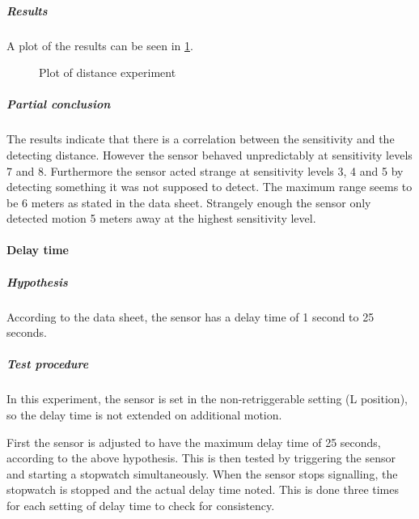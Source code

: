 \subparagraph{Results}

A plot of the results can be seen in \cref{fig:pir_distance}.

\begin{figure}[htbp]
\centering
{}
\caption[Distance experiment]{Plot of distance experiment}\label{fig:pir_distance}
\end{figure}

\subparagraph{Partial conclusion}
The results indicate that there is a correlation between the sensitivity and the detecting distance.
However the sensor behaved unpredictably at sensitivity levels 7 and 8.
Furthermore the sensor acted strange at sensitivity levels 3, 4 and 5 by detecting something it was not supposed to detect.
The maximum range seems to be 6 meters as stated in the data sheet.
Strangely enough the sensor only detected motion 5 meters away at the highest
sensitivity level.

\paragraph{Delay time}

\subparagraph{Hypothesis}

According to the data sheet, the sensor has a delay time of 1 second to 25 seconds.

\subparagraph{Test procedure}

In this experiment, the sensor is set in the non-retriggerable setting (L
position), so the delay time is not extended on additional motion.

First the sensor is adjusted to have the maximum delay time of 25 seconds,
according to the above hypothesis. This is then tested by triggering the sensor
and starting a stopwatch simultaneously. When the sensor stops signalling, the
stopwatch is stopped and the actual delay time noted. This is done three times
for each setting of delay time to check for consistency.

